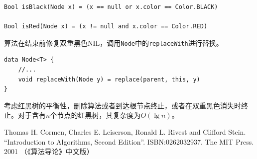 \documentclass[b5paper]{ctexart}
\begin{document}
\begin{lstlisting}[language = Bourbaki]
Bool isBlack(Node x) = (x == null or x.color == Color.BLACK)

Bool isRed(Node x) = (x != null and x.color == Color.RED)
\end{lstlisting}

算法在结束前修复双重黑色NIL，调用\texttt{Node}中的\texttt{replaceWith}进行替换。

\begin{lstlisting}[language = Bourbaki]
data Node<T> {
    //...
    void replaceWith(Node y) = replace(parent, this, y)
}
\end{lstlisting}

考虑红黑树的平衡性，删除算法或者到达根节点终止，或者在双重黑色消失时终止。对于含有$n$个节点的红黑树，其复杂度为$O(\lg n)$。


\ifx\wholebook\relax \else

\begin{thebibliography}{99}

Thomas H. Cormen, Charles E. Leiserson, Ronald L. Rivest and Clifford Stein.
``Introduction to Algorithms, Second Edition''. ISBN:0262032937. The MIT Press. 2001 （《算法导论》中文版）

\end{thebibliography}

\expandafter\enddocument
\fi
\end{document}
